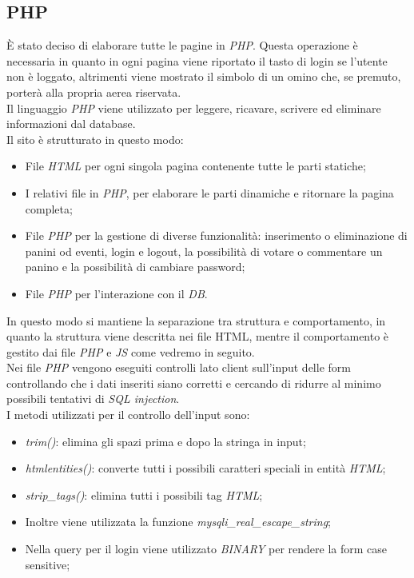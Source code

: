\subsection{PHP}
È stato deciso di elaborare tutte le pagine in \emph{PHP}. 
Questa operazione è necessaria in quanto in ogni 
pagina viene riportato il tasto di login se l'utente non è loggato, altrimenti viene mostrato il simbolo di un omino che, se premuto, porterà alla propria aerea riservata.\\
Il linguaggio \emph{PHP} viene utilizzato per leggere, ricavare, scrivere ed eliminare informazioni dal database.\\
Il sito è strutturato in questo modo: 
\begin{itemize}
    \item File \emph{HTML} per ogni singola pagina contenente tutte le parti statiche;
    \item I relativi file in \emph{PHP}, per elaborare le parti dinamiche e ritornare la pagina completa;
    \item File \emph{PHP} per la gestione di diverse funzionalità: inserimento o eliminazione di panini od eventi, login e logout, la possibilità di votare o commentare un panino e la possibilità di cambiare password;
    \item File \emph{PHP} per l'interazione con il \emph{DB}.
\end{itemize}
In questo modo si mantiene la separazione tra struttura e comportamento, in quanto la struttura viene descritta nei file HTML, mentre il comportamento è gestito dai file \emph{PHP} e \emph{JS} come vedremo in seguito.\\

Nei file \emph{PHP} vengono eseguiti controlli lato client sull'input delle form controllando che i dati inseriti siano corretti e cercando di ridurre al minimo possibili tentativi di \emph{SQL injection}.\\
I metodi utilizzati per il controllo dell'input sono: 
    \begin{itemize}
        \item \emph{trim()}: elimina gli spazi prima e dopo la stringa in input;
        \item \emph{htmlentities()}: converte tutti i possibili caratteri speciali in entità \emph{HTML};
        \item \emph{strip\_tags()}: elimina tutti i possibili tag \emph{HTML};
        \item Inoltre viene utilizzata la funzione \emph{mysqli\_real\_escape\_string};
        \item Nella query per il login viene utilizzato \emph{BINARY} per rendere la form case sensitive;
    \end{itemize}